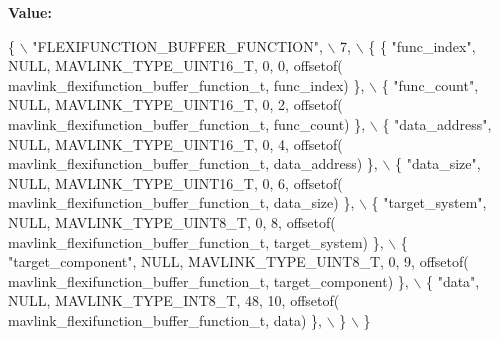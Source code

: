 {\bfseries Value\+:}
\begin{DoxyCode}
\{ \(\backslash\)
    \textcolor{stringliteral}{"FLEXIFUNCTION\_BUFFER\_FUNCTION"}, \(\backslash\)
    7, \(\backslash\)
    \{  \{ \textcolor{stringliteral}{"func\_index"}, NULL, MAVLINK_TYPE_UINT16_T, 0, 0, offsetof(
      mavlink_flexifunction_buffer_function_t, func\_index) \}, \(\backslash\)
         \{ \textcolor{stringliteral}{"func\_count"}, NULL, MAVLINK_TYPE_UINT16_T, 0, 2, offsetof(
      mavlink_flexifunction_buffer_function_t, func\_count) \}, \(\backslash\)
         \{ \textcolor{stringliteral}{"data\_address"}, NULL, MAVLINK_TYPE_UINT16_T, 0, 4, offsetof(
      mavlink_flexifunction_buffer_function_t, data\_address) \}, \(\backslash\)
         \{ \textcolor{stringliteral}{"data\_size"}, NULL, MAVLINK_TYPE_UINT16_T, 0, 6, offsetof(
      mavlink_flexifunction_buffer_function_t, data\_size) \}, \(\backslash\)
         \{ \textcolor{stringliteral}{"target\_system"}, NULL, MAVLINK_TYPE_UINT8_T, 0, 8, offsetof(
      mavlink_flexifunction_buffer_function_t, target\_system) \}, \(\backslash\)
         \{ \textcolor{stringliteral}{"target\_component"}, NULL, MAVLINK_TYPE_UINT8_T, 0, 9, offsetof(
      mavlink_flexifunction_buffer_function_t, target\_component) \}, \(\backslash\)
         \{ \textcolor{stringliteral}{"data"}, NULL, MAVLINK_TYPE_INT8_T, 48, 10, offsetof(
      mavlink_flexifunction_buffer_function_t, data) \}, \(\backslash\)
         \} \(\backslash\)
\}
\end{DoxyCode}
\mbox{\label{mavlink__msg__flexifunction__buffer__function_8h_ace22d93f578f32da851762a23df74ce3}} 
